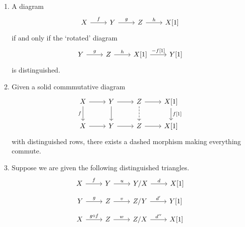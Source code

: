 \documentclass[main.tex]{subfiles}
\begin{document}
\begin{definition}
\begin{enumerate}[label=(TR\arabic*), leftmargin=*]
    \item A diagram
      \begin{equation*}
        \begin{tikzcd}
          X
          \arrow[r, "f"]
          & Y
          \arrow[r, "g"]
          & Z
          \arrow[r, "h"]
          & X[1]
        \end{tikzcd}
      \end{equation*}
      if and only if the `rotated' diagram
      \begin{equation*}
        \begin{tikzcd}
          Y
          \arrow[r, "g"]
          & Z
          \arrow[r, "h"]
          & X[1]
          \arrow[r, "{-f[1]}"]
          & Y[1]
        \end{tikzcd}
      \end{equation*}
      is distinguished.

    \item Given a solid commmutative diagram
      \begin{equation*}
        \begin{tikzcd}
          X
          \arrow[r]
          \arrow[d, swap, "f"]
          & Y
          \arrow[r]
          \arrow[d]
          & Z
          \arrow[r]
          \arrow[d, dashed]
          & X[1]
          \arrow[d, "{f[1]}"]
          \\
          X
          \arrow[r]
          & Y
          \arrow[r]
          & Z
          \arrow[r]
          & X[1]
        \end{tikzcd}
      \end{equation*}
      with distinguished rows, there exists a dashed morphism making everything commute.

    \item Suppose we are given the following distinguished triangles.
      \begin{equation*}
        \begin{tikzcd}
          X
          \arrow[r, "f"]
          & Y
          \arrow[r, "u"]
          & Y/X
          \arrow[r, "d"]
          & X[1]
        \end{tikzcd}
      \end{equation*}
      \begin{equation*}
        \begin{tikzcd}
          Y
          \arrow[r, "g"]
          & Z
          \arrow[r, "v"]
          & Z/Y
          \arrow[r, "d'"]
          & Y[1]
        \end{tikzcd}
      \end{equation*}
      \begin{equation*}
        \begin{tikzcd}
          X
          \arrow[r, "g \circ f"]
          & Z
          \arrow[r, "w"]
          & Z/X
          \arrow[r, "d''"]
          & X[1]
        \end{tikzcd}
      \end{equation*}


\end{enumerate}
\end{definition}
\end{document}
